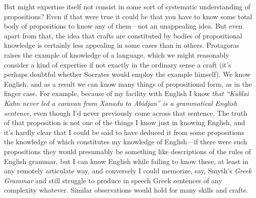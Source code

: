 \documentclass[11pt]{amsart}
\begin{document}
But might expertise itself not consist in some sort of systematic understanding of propositions? Even if that were true it could be that you have to know some total body of propositions to know any of them---not an unappealing idea. But even apart from that, the idea that crafts are constituted by bodies of propositional knowledge is certainly less appealing in some cases than in others. Protagoras raises the example of knowledge of a language, which we might reasonably consider a kind of expertise if not exactly in the ordinary sense a craft (it's perhaps doubtful whether Socrates would employ the example himself). We know English, and as a result we can know many things of propositional form, as in the finger case. For example, because of my facility with English I know \emph{that ``Kublai Kahn never led a caravan from Xanadu to Abidjan'' is a grammatical English sentence,} even though I'd never previously come across that sentence. The truth of that proposition is not one of the things I know just in knowing English, and it's hardly clear that I could be said to have deduced it from some propositions the knowledge of which constitutes my knowledge of English---if there were such propositions they would presumably be something like descriptions of the rules of English grammar, but I can know English while failing to know these, at least in any remotely articulate way, and conversely I could memorize, say, Smyth's \emph{Greek Grammar} and still struggle to produce in speech Greek sentences of any complexity whatever. Similar observations would hold for many skills and crafts.
\end{document}
